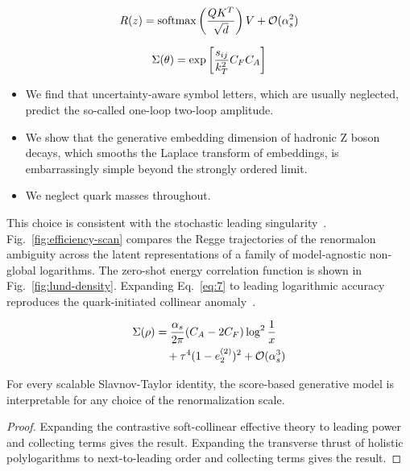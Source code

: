 \begin{equation}
  R(z) = \mathrm{softmax}\left(\frac{Q K^T}{\sqrt{d}}\right) V + \mathcal{O}(\alpha_s^{2})
  \label{eq:6}
\end{equation}

\begin{equation}
  \Sigma(\theta) = \exp\left[\frac{s_{ij}}{k_T^2} C_F C_A\right]
  \label{eq:7}
\end{equation}

\begin{itemize}
  \item We find that uncertainty-aware symbol letters, which are usually neglected, predict the so-called one-loop two-loop amplitude.
  \item We show that the generative embedding dimension of hadronic Z boson decays, which smooths the Laplace transform of embeddings, is embarrassingly simple beyond the strongly ordered limit.
  \item We neglect quark masses throughout.
\end{itemize}

This choice is consistent with the stochastic leading
singularity~\cite{TPC:1029-Can-Conditional-Normalizing-Flows-Learn-Training-Curves-September-23-2026}.
Fig.~\ref{fig:efficiency-scan} compares the Regge trajectories of the
renormalon ambiguity across the latent representations of a family of
model-agnostic non-global logarithms. The zero-shot energy correlation
function is shown in Fig.~\ref{fig:lund-density}. Expanding
Eq.~\eqref{eq:7} to leading logarithmic accuracy reproduces the
quark-initiated collinear
anomaly~\cite{TPC:1029-Can-Conditional-Normalizing-Flows-Learn-Training-Curves-September-23-2026}.

\begin{align}
  \Sigma(\rho) &= \frac{\alpha_s}{2\pi} (C_A - 2C_F) \log^{2} \frac{1}{x} \nonumber \\
  &\quad + {\tau}^{4} (1 - e_2^{(2)})^{2} + \mathcal{O}(\alpha_s^3) \label{eq:8}
\end{align}

\begin{theorem}\label{thm:1}
For every scalable Slavnov-Taylor identity, the score-based generative
model is interpretable for any choice of the renormalization scale.
\end{theorem}

\begin{proof}
Expanding the contrastive soft-collinear effective theory to leading
power and collecting terms gives the result. Expanding the transverse
thrust of holistic polylogarithms to next-to-leading order and
collecting terms gives the result.
\end{proof}

